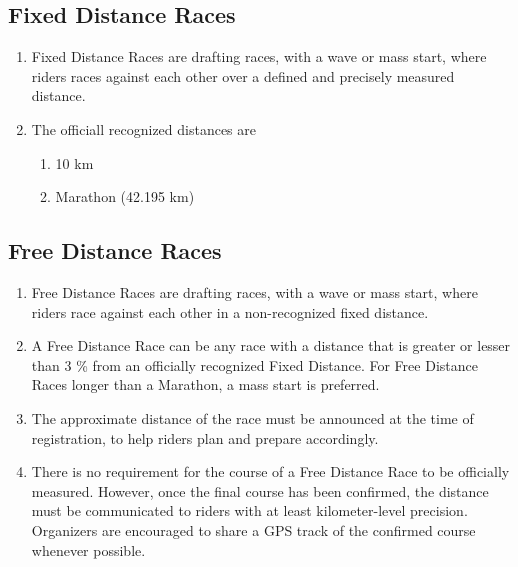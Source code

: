 \subsection{Fixed Distance Races}
	\begin{enumerate}[leftmargin=1.5em,labelsep=*]
		\item Fixed Distance Races are drafting races, with a wave or mass start, where riders races against each other over a defined and precisely measured distance.
		\item The officiall recognized distances are
		\begin{enumerate}[label=\roman*,leftmargin=2.25em,labelsep=*]
			\item 10 km
			\item Marathon (42.195 km)
		\end{enumerate}
	\end{enumerate}

\subsection{Free Distance Races}
	\begin{enumerate}[leftmargin=1.5em,labelsep=*]
		\item Free Distance Races are drafting races, with a wave or mass start, where riders race against each other in a non-recognized fixed distance.
		\item A Free Distance Race can be any race with a distance that is greater or lesser than 3 \% from an officially recognized Fixed Distance.
		For Free Distance Races longer than a Marathon, a mass start is preferred.
		\item The approximate distance of the race must be announced at the time of registration, to help riders plan and prepare accordingly.
		\item There is no requirement for the course of a Free Distance Race to be officially measured.
		However, once the final course has been confirmed, the distance must be communicated to riders with at least kilometer-level precision.
		Organizers are encouraged to share a GPS track of the confirmed course whenever possible.
	\end{enumerate}

